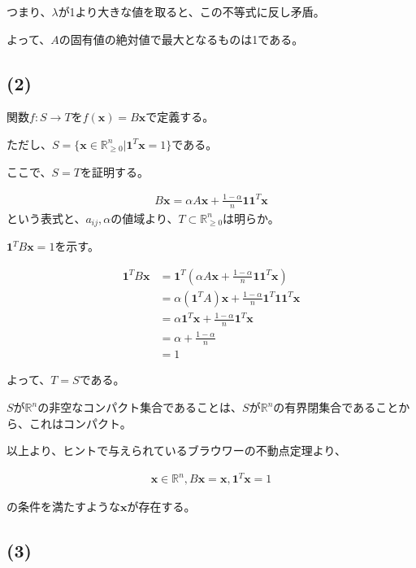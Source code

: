 \documentclass[a4paper, 10pt, dvipdfmx]{jlreq}
\begin{document}
つまり、$\lambda$が1より大きな値を取ると、この不等式に反し矛盾。

よって、$A$の固有値の絶対値で最大となるものは1である。

\subsection*{(2)}

関数$f:S \to T$を$f(\bm{x})=B\bm{x}$で定義する。

ただし、$S=\{\bm{x}\in \mathbb{R}_{\geq 0}^n | \bm{1}^T\bm{x}=1 \}$である。

ここで、$S=T$を証明する。

\begin{align*}
    B\bm{x}=\alpha A\bm{x}+\frac{1-\alpha}{n}\bm{1}\bm{1}^T\bm{x}
\end{align*}
という表式と、$a_{ij},\alpha$の値域より、$T \subset \mathbb{R}_{\geq 0}^n$は明らか。

$\bm{1}^TB\bm{x}=1$を示す。

\begin{align*}
    \bm{1}^TB\bm{x} & =\bm{1}^T\left(\alpha A\bm{x}+\frac{1-\alpha}{n}\bm{1}\bm{1}^T\bm{x}\right) \\
                    & =\alpha (\bm{1}^TA)\bm{x}+\frac{1-\alpha}{n}\bm{1}^T\bm{1}\bm{1}^T\bm{x}    \\
                    & =\alpha \bm{1}^T\bm{x}+\frac{1-\alpha}{n}\bm{1}^T\bm{x}                     \\
                    & =\alpha+\frac{1-\alpha}{n}                                                  \\
                    & =1
\end{align*}

よって、$T=S$である。

$S$が$\mathbb{R}^n$の非空なコンパクト集合であることは、$S$が$\mathbb{R}^n$の有界閉集合であることから、これはコンパクト。

以上より、ヒントで与えられているブラウワーの不動点定理より、

\begin{align*}
    \bm{x}\in \mathbb{R}^n,
    B\bm{x}=\bm{x}, \bm{1}^T\bm{x}=1
\end{align*}

の条件を満たすような$\bm{x}$が存在する。

\subsection*{(3)}
\end{document}
